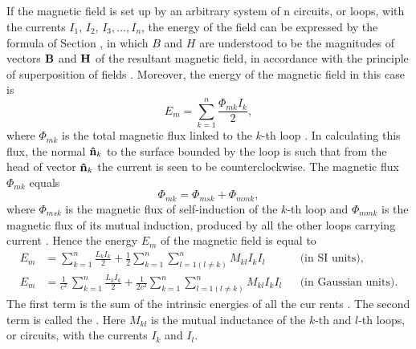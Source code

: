\subsection{}\label{25.4.5} If the magnetic field is set up by an arbitrary system of n circuits, or loops, with the currents $I_{1}, \, I_{2}, \, I_{3}, \ldots{}, I_{n}$, the energy of the field can be expressed by the formula of Section , in which $B$ and $H$ are understood to be the magnitudes of vectors $\vb{B}$ and $\vb{H}$ of the resultant magnetic field, in accordance with the principle of superposition of fields . Moreover, the energy of the magnetic field in this case is
\begin{equation*}%
E_{m} = \sum_{k=1}^{n} \frac{\Phi_{mk}I_{k}}{2},
\end{equation*}
where $\Phi_{mk}$ is the total magnetic flux linked to the $k$-th loop . In calculating this flux, the normal $\vu{n}_{k}$ to the surface bounded by the loop is such that from the head of vector $\vu{n}_{k}$ the current is seen to be counterclockwise. The magnetic flux $\Phi_{mk}$ equals
\begin{equation*}%
\Phi_{mk} = \Phi_{msk} + \Phi_{mmk},
\end{equation*}
where $\Phi_{msk}$ is the magnetic flux of self-induction of the $k$-th loop  and $\Phi_{mmk}$ is the magnetic flux of its mutual induction, produced by all the other loops carrying current . Hence the energy $E_{m}$ of the magnetic field is equal to
\begin{align*}%
E_{m} & =  \sum_{k=1}^{n} \frac{L_{k}I_{k}}{2} + \frac{1}{2} \sum_{k=1}^{n}\sum_{l=1(l \neq k)}^{n} M_{kl} I_{k}I_{l}&& \text{(in SI units),} \\
E_{m} &  =\frac{1}{c^{2}} \, \sum_{k=1}^{n} \frac{L_{k}I_{k}}{2} + \frac{1}{2c^{2}} \sum_{k=1}^{n}\sum_{l=1(l \neq k)}^{n} M_{kl} I_{k}I_{l} &&  \text{(in Gaussian units).}
\end{align*}
The first term is the sum of the intrinsic energies of all the cur­ rents . The second term is called the . Here $M_{kl}$ is the mutual inductance of the $k$-th and $l$-th loops, or circuits,  with the currents $I_{k}$ and $I_{l}$.


